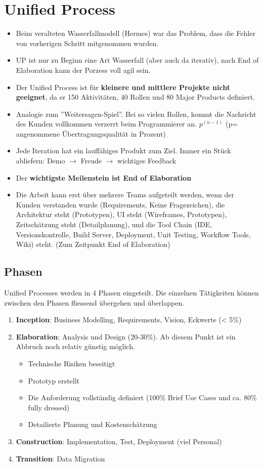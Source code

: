\section{Unified Process}
\begin{itemize}
	\item Beim veralteten Wasserfallmodell (Hermes) war das Problem, dass die Fehler von vorherigen Schritt mitgenommen wurden. 
	\item UP ist nur zu Beginn eine Art Wasserfall (aber auch da iterativ), nach End of Elaboration kann der Porzess voll agil sein.
	\item Der Unified Process ist für \textbf{kleinere und mittlere Projekte nicht geeignet}, da er 150 Aktivitäten, 40 Rollen und 80 Major Products definiert. 
	\item Analogie zum ''Weitersagen-Spiel''. Bei so vielen Rollen, kommt die Nachricht des Kunden vollkommen verzerrt beim Programmierer an. $p^{(n-1)}$ (p= angenommene Übertragungsqualität in Prozent)
	\item Jede Iteration hat ein lauffähiges Produkt zum Ziel. Immer ein Stück abliefern: Demo $\rightarrow$ Freude $\rightarrow$ wichtiges Feedback
	\item Der \textbf{wichtigste Meilenstein ist End of Elaboration}
	\item Die Arbeit kann erst über mehrere Teams aufgeteilt werden, wenn der Kunden verstanden wurde (Requirements, Keine Fragezeichen), die Architektur steht (Prototypen), UI steht (Wireframes, Prototypen), Zeitschätzung steht (Detailplanung), und die Tool Chain (IDE, Versionskontrolle, Build Server, Deployment, Unit Testing, Workflow Tools, Wiki) steht. (Zum Zeitpunkt End of Elaboration)
\end{itemize}

\subsection{Phasen}
Unified Processes werden in 4 Phasen eingeteilt. Die einzelnen Tätigkeiten können zwischen den Phasen fliessend übergehen und überlappen.
\begin{enumerate}
	\item \textbf{Inception}: Business Modelling, Requirements, Vision, Eckwerte (< 5\%)
	\item \textbf{Elaboration}: Analysis und Design (20-30\%). Ab diesem Punkt ist ein Abbruch noch relativ günstig möglich. 
	\begin{itemize}
		\item Technische Risiken beseitigt
		\item Prototyp erstellt
		\item Die Anforderung vollständig definiert (100\% Brief Use Cases und ca. 80\% fully dressed) 
		\item Detailierte Planung und Kostenschätzung
	\end{itemize}
	\item \textbf{Construction}: Implementation, Test, Deployment (viel Personal)
	\item \textbf{Transition}: Data Migration
\end{enumerate}

